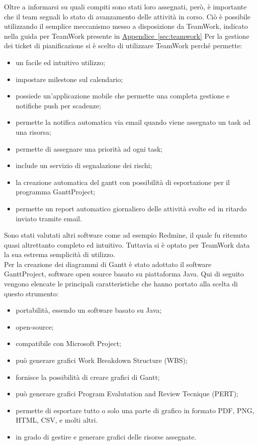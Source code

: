			Oltre a informarsi su quali compiti sono stati loro assegnati, però, è importante che il team segnali lo stato di avanzamento delle attività in corso. Ciò è possibile utilizzando il semplice meccanismo messo a disposizione da TeamWork, indicato nella guida per TeamWork presente in \hyperref[sec:teamwork]{Appendice~\ref*{sec:teamwork}}
			Per la gestione dei ticket di pianificazione si è scelto di utilizzare TeamWork perché permette:
			\begin{itemize}
				\item un facile ed intuitivo utilizzo;
				\item impostare milestone sul calendario;
				\item possiede un'applicazione mobile che permette una completa gestione e notifiche push per scadenze;
				\item permette la notifica automatica via email quando viene assegnato un task ad una risorsa;
				\item permette di assegnare una priorità ad ogni task;
				\item include un servizio di segnalazione dei rischi;
				\item la creazione automatica del gantt con possibilità di esportazione per il programma GanttProject;
				\item permette un report automatico giornaliero delle attività svolte ed in ritardo inviato tramite email.
			\end{itemize}
			Sono stati valutati altri software come ad esempio Redmine, il quale fu ritenuto quasi altrettanto completo ed intuitivo. Tuttavia si è optato per TeamWork data la sua estrema semplicità di utilizzo.\\
	Per la creazione dei diagrammi di Gantt è stato adottato il software GanttProject, software open source basato su piattaforma Java. Qui di seguito vengono elencate le principali caratteristiche che hanno portato alla scelta di questo strumento:
	\begin{itemize}
		\item portabilità, essendo un software basato su Java;
		\item open-source;
		\item compatibile con Microsoft Project;
		\item può generare grafici Work Breakdown Structure (WBS);
		\item fornisce la possibilità di creare grafici di Gantt;
		\item può generare grafici Program Evalutation and Review Tecnique (PERT);
		\item permette di esportare tutto o solo una parte di grafico in formato PDF, PNG, HTML, CSV, e molti altri.
		\item in grado di gestire e generare grafici delle risorse assegnate.
	\end{itemize}
